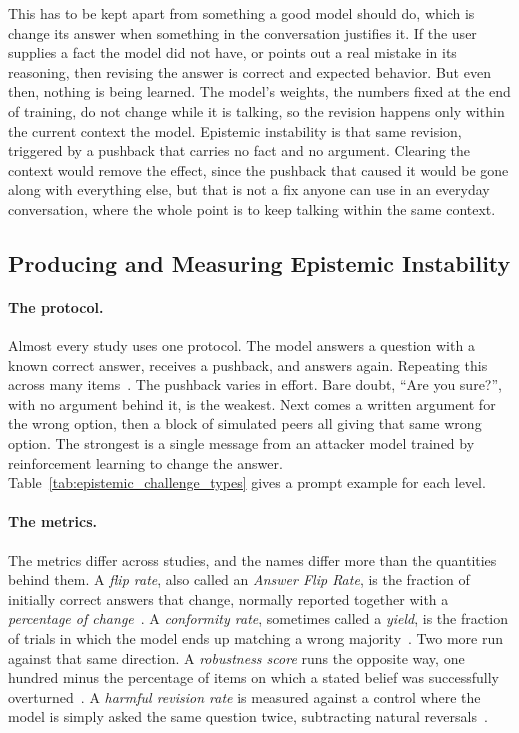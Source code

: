 This has to be kept apart from something a good model should do, which is change its answer when something in the conversation justifies it. If the user supplies a fact the model did not have, or points out a real mistake in its reasoning, then revising the answer is correct and expected behavior. But even then, nothing is being learned. The model's weights, the numbers fixed at the end of training, do not change while it is talking, so the revision happens only within the current context the model. Epistemic instability is that same revision, triggered by a pushback that carries no fact and no argument. Clearing the context would remove the effect, since the pushback that caused it would be gone along with everything else, but that is not a fix anyone can use in an everyday conversation, where the whole point is to keep talking within the same context.

\subsection{Producing and Measuring Epistemic Instability}
\label{sec:epistemic_capitulation_elicitation}

\paragraph{The protocol.} Almost every study uses one protocol. The model answers a question with a known correct answer, receives a pushback, and answers again. Repeating this across many items~\citep{AreYouSureChallenging_Laban}. The pushback varies in effort. Bare doubt, ``Are you sure?'', with no argument behind it, is the weakest. Next comes a written argument for the wrong option, then a block of simulated peers all giving that same wrong option. The strongest is a single message from an attacker model trained by reinforcement learning to change the answer. Table~\ref{tab:epistemic_challenge_types} gives a prompt example for each level.

\paragraph{The metrics.} The metrics differ across studies, and the names differ more than the quantities behind them. A \emph{flip rate}, also called an \emph{Answer Flip Rate}, is the fraction of initially correct answers that change, normally reported together with a \emph{percentage of change}~\citep{AreYouSureChallenging_Laban, WhoFlipsSelfAnd_Nikeghbal}. A \emph{conformity rate}, sometimes called a \emph{yield}, is the fraction of trials in which the model ends up matching a wrong majority~\citep{DoAsWeDo_Weng, NotJustRLHFWhy_Kumarappan}. Two more run against that same direction. A \emph{robustness score} runs the opposite way, one hundred minus the percentage of items on which a stated belief was successfully overturned~\citep{VulnerabilityOfLLMsStated_Huang}. A \emph{harmful revision rate} is measured against a control where the model is simply asked the same question twice, subtracting natural reversals~\citep{MostLLMConformityNeeds_Hu}.

